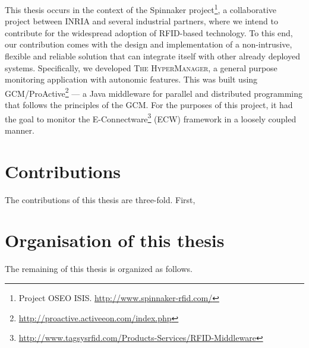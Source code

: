 	This thesis occurs in the context of the Spinnaker project\footnote{Project OSEO ISIS. \url{http://www.spinnaker-rfid.com/}}, 
	a collaborative project between INRIA and several industrial partners, where we intend to contribute for the widespread
	adoption of \ac{RFID}-based technology. To this end, our contribution comes with the design and implementation
	of a non-intrusive, flexible and reliable solution that can integrate itself with other already deployed
	systems.	Specifically, we developed \textsc{The HyperManager}, a general purpose monitoring
	application with autonomic features. This was built using GCM/ProActive\footnote{\url{http://proactive.activeeon.com/index.php}} --- a Java middleware for parallel
	and distributed programming that follows the principles of the \ac{GCM}. For the purposes
	of this project, it had the goal to monitor the \textsf{E-Connectware}\footnote{\url{http://www.tagsysrfid.com/Products-Services/RFID-Middleware}}  
	(\textsf{ECW}) framework in a loosely coupled manner.





	


\section{Contributions}
\label{sec:contrib}

	
	The contributions of this thesis are three-fold. First,


\section{Organisation of this thesis}
\label{sec:struct}

	The remaining of this thesis is organized as follows.


